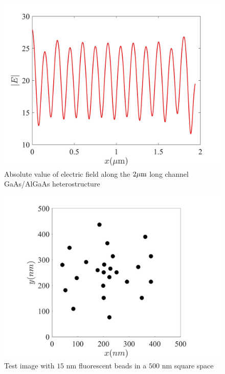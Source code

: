 \documentclass[11pt]{article}
\begin{document}
\begin{figure}[h!]
  \centering
  \includegraphics[scale=.5]{no_port.png}
  \caption{Absolute value of electric field along the $2 \mu \mathrm{m} $ long channel GaAs/AlGaAs heterostructure}
  \label{fig:standing_wave}
\end{figure}

\begin{figure}[h!]
  \centering
  \includegraphics[scale=1]{test.png}
  \caption{Test image with $15$ nm fluorescent beads in a $500$ nm square space}
  \label{fig:scheme}
\end{figure}
\end{document}
